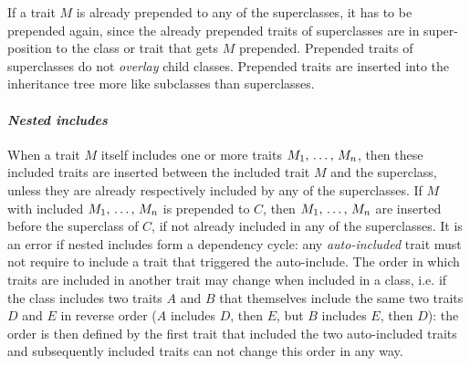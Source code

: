If a trait $M$ is already prepended to any of the superclasses, it has to be prepended again, since the already prepended traits of superclasses are in super-position to the class or trait that gets $M$ prepended. Prepended traits of superclasses do not {\em overlay} child classes. Prepended traits are inserted into the inheritance tree more like subclasses than superclasses. 

\paragraph{\em Nested includes}
When a trait $M$ itself includes one or more traits $M_1 ,\, \ldots ,\, M_n$, then these included traits are inserted between the included trait $M$ and the superclass, unless they are already respectively included by any of the superclasses. If $M$ with included $M_1 ,\, \ldots ,\, M_n$ is prepended to $C$, then $M_1 ,\, \ldots ,\, M_n$ are inserted before the superclass of $C$, if not already included in any of the superclasses. It is an error if nested includes form a dependency cycle: any {\em auto-included} trait must not require to include a trait that triggered the auto-include. The order in which traits are included in another trait may change when included in a class, i.e. if the class includes two traits $A$ and $B$ that themselves include the same two traits $D$ and $E$ in reverse order ($A$ includes $D$, then $E$, but $B$ includes $E$, then $D$): the order is then defined by the first trait that included the two auto-included traits and subsequently included traits can not change this order in any way. 

